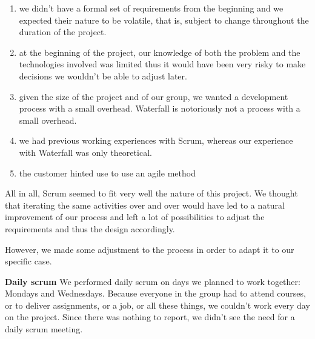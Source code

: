 \begin{enumerate}
\item we didn't have a formal set of requirements from the beginning and we expected
their nature to be volatile, that is, subject to change throughout the duration of the project.


\item at the beginning of the project, our knowledge of both the problem and the technologies involved
was limited thus it would have been very risky to make decisions we wouldn't be able to adjust later.

\item given the size of the project and of our group, we wanted a development process
with a small overhead. Waterfall is notoriously not a process with a small overhead.

\item we had previous working experiences with Scrum, whereas our experience with Waterfall was only theoretical.

\item the customer hinted use to use an agile method

\end{enumerate}

All in all, Scrum seemed to fit very well the nature of this project.
We thought that iterating the same activities over and over would have led to a natural improvement of our process
and left a lot of possibilities to adjust the requirements and thus the design accordingly.

However, we made some adjustment to the process in order to adapt it to our specific case.

\textbf{Daily scrum}\newline
We performed daily scrum on days we planned to work together: Mondays and Wednesdays.
Because everyone in the group had to attend courses, or to deliver assignments, or a job, or all these things,
we couldn't work every day on the project. Since there was nothing to report, we didn't see the need for a daily
scrum meeting.

